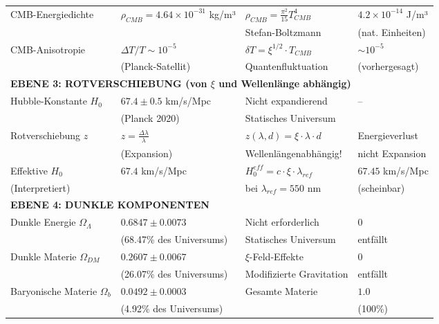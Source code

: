 \documentclass[12pt,a4paper]{article}
\theoremstyle{definition}
\begin{document}
\begin{longtable}{p{5cm}p{4cm}p{3.5cm}p{3.5cm}}
	CMB-Energiedichte & $\rho_{CMB} = 4.64 \times 10^{-31}$ kg/m³ & $\rho_{CMB} = \frac{\pi^2}{15} T_{CMB}^4$ & $4.2 \times 10^{-14}$ J/m³ \\
	& & Stefan-Boltzmann & (nat. Einheiten) \\[0.3em]
	
	CMB-Anisotropie & $\Delta T/T \sim 10^{-5}$ & $\delta T = \xi^{1/2} \cdot T_{CMB}$ & $\sim 10^{-5}$ \\
	& (Planck-Satellit) & Quantenfluktuation & (vorhergesagt) \\[0.3em]
	
	\midrule
	\multicolumn{4}{l}{\textbf{EBENE 3: ROTVERSCHIEBUNG (von $\xi$ und Wellenlänge abhängig)}} \\
	\midrule
	
	Hubble-Konstante $H_0$ & $67.4 \pm 0.5$ km/s/Mpc & Nicht expandierend & -- \\
	& (Planck 2020) & Statisches Universum & \\[0.3em]
	
	Rotverschiebung $z$ & $z = \frac{\Delta\lambda}{\lambda}$ & $z(\lambda, d) = \xi \cdot \lambda \cdot d$ & Energieverlust \\
	& (Expansion) & Wellenlängenabhängig! & nicht Expansion \\[0.3em]
	
	Effektive $H_0$ & $67.4$ km/s/Mpc & $H_0^{eff} = c \cdot \xi \cdot \lambda_{ref}$ & $67.45$ km/s/Mpc \\
	(Interpretiert) & & bei $\lambda_{ref} = 550$ nm & (scheinbar) \\[0.3em]
	
	\midrule
	\multicolumn{4}{l}{\textbf{EBENE 4: DUNKLE KOMPONENTEN}} \\
	\midrule
	
	Dunkle Energie $\Omega_\Lambda$ & $0.6847 \pm 0.0073$ & Nicht erforderlich & $0$ \\
	& (68.47\% des Universums) & Statisches Universum & entfällt \\[0.3em]
	
	Dunkle Materie $\Omega_{DM}$ & $0.2607 \pm 0.0067$ & $\xi$-Feld-Effekte & $0$ \\
	& (26.07\% des Universums) & Modifizierte Gravitation & entfällt \\[0.3em]
	
	Baryonische Materie $\Omega_b$ & $0.0492 \pm 0.0003$ & Gesamte Materie & $1.0$ \\
	& (4.92\% des Universums) & & (100\%) \\[0.3em]
	

\end{longtable}
\end{document}
